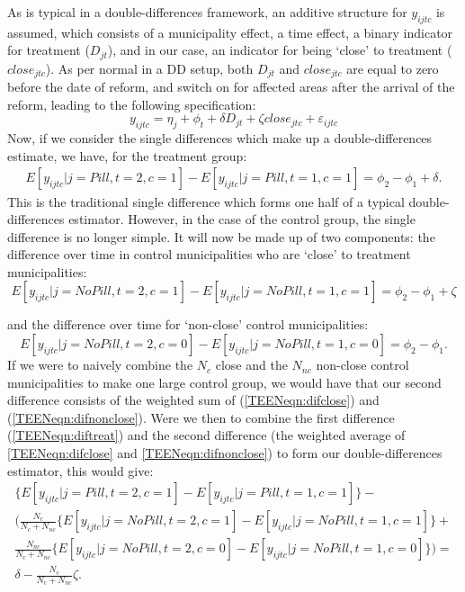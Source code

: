 As is typical in a double-differences framework, an additive structure for 
$y_{ijtc}$ is assumed, which consists of a municipality effect, a time effect,
a binary indicator for treatment ($D_{jt}$), and in our case, an indicator for 
being `close' to treatment ($close_{jtc}$).  As per normal in a DD setup, both
$D_{jt}$ and $close_{jtc}$ are equal to zero before the date of reform, and 
switch on for affected areas after the arrival of the reform, leading to the
following specification:
\begin{equation}
 \label{TEENeqn:DDa1}
 y_{ijtc} = \eta_j + \phi_t + \delta D_{jt} + \zeta close_{jtc} + 
\varepsilon_{ijtc}
\end{equation}
Now, if we consider the single differences which make up a double-differences 
estimate, we have, for the treatment group:
\begin{eqnarray}
\label{TEENeqn:diftreat}
 E[y_{ijtc}|j=Pill,t=2,c=1]- E[y_{ijtc}|j=Pill,t=1,c=1] = \phi_2-\phi_1+\delta.
\end{eqnarray}
This is the traditional single difference which forms one half of a typical
double-differences estimator.  However, in the case of the control group, the
single difference is no longer simple.  It will now be made up of two components:
the difference over time in control municipalities who are `close' to treatment 
municipalities:
\renewcommand{\theequation}{3.\arabic{equation}a}
\begin{equation}
\label{TEENeqn:difclose}
 E[y_{ijtc}|j=No Pill,t=2,c=1]- E[y_{ijtc}|j=No Pill,t=1,c=1] = \phi_2-\phi_1+\zeta
\end{equation}
\addtocounter{equation}{-1}
\renewcommand{\theequation}{3.\arabic{equation}b}
and the difference over time for `non-close' control municipalities:
\begin{equation}
\label{TEENeqn:difnonclose}
 E[y_{ijtc}|j=No Pill,t=2,c=0]- E[y_{ijtc}|j=No Pill,t=1,c=0] = \phi_2-\phi_1.
\end{equation}
\renewcommand{\theequation}{3.\arabic{equation}}
If we were to naively combine the $N_c$ close and the $N_{nc}$ non-close control 
municipalities to make one large control group, we would have that our second 
difference consists of the weighted sum of (\ref{TEENeqn:difclose}) and 
(\ref{TEENeqn:difnonclose}).  Were we then to combine the first difference 
(\ref{TEENeqn:diftreat}) and the second difference (the weighted average of 
\ref{TEENeqn:difclose} and \ref{TEENeqn:difnonclose}) to form our 
double-differences estimator, this would give:
\begin{equation}
\begin{split}
 \{E[y_{ijtc}|j=Pill,t=2,c=1]- E[y_{ijtc}|j=Pill,t=1,c=1]\}-\\
 \bigg(\frac{N_c}{N_c+N_{nc}}\{E[y_{ijtc}|j=No Pill,t=2,c=1]- E[y_{ijtc}|j=No Pill,t=1,c=1]\}+\\
 \frac{N_{nc}}{N_c+N_{nc}}\{E[y_{ijtc}|j=No Pill,t=2,c=0]- E[y_{ijtc}|j=No Pill,t=1,c=0]\}\bigg) = \\
 \delta - \frac{N_{c}}{N_{c}+N_{nc}}\zeta.
 \end{split}
\end{equation}
